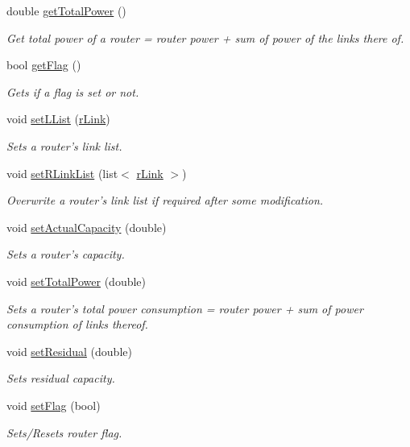 \begin{DoxyCompactItemize}
double \hyperlink{classrouter_a425b6d8372b0951a77097d0e6b49914a}{getTotalPower} ()
\begin{DoxyCompactList}\small\item\em Get total power of a router = router power + sum of power of the links there of. \item\end{DoxyCompactList}\item 
bool \hyperlink{classrouter_aaa3d78b2556a095f725d5a2202265d55}{getFlag} ()
\begin{DoxyCompactList}\small\item\em Gets if a flag is set or not. \item\end{DoxyCompactList}\item 
void \hyperlink{classrouter_a20f58c16edd3ca8d8afb73cf9f27f549}{setLList} (\hyperlink{classrLink}{rLink})
\begin{DoxyCompactList}\small\item\em Sets a router's link list. \item\end{DoxyCompactList}\item 
void \hyperlink{classrouter_a28908a05b7e50a0ab45481c94c8042a8}{setRLinkList} (list$<$ \hyperlink{classrLink}{rLink} $>$)
\begin{DoxyCompactList}\small\item\em Overwrite a router's link list if required after some modification. \item\end{DoxyCompactList}\item 
void \hyperlink{classrouter_a90c5339e7bed5597f06be903305ef588}{setActualCapacity} (double)
\begin{DoxyCompactList}\small\item\em Sets a router's capacity. \item\end{DoxyCompactList}\item 
void \hyperlink{classrouter_a9b06f4e341fea7bf5a853b0a2caf1d2a}{setTotalPower} (double)
\begin{DoxyCompactList}\small\item\em Sets a router's total power consumption = router power + sum of power consumption of links thereof. \item\end{DoxyCompactList}\item 
void \hyperlink{classrouter_ac839466bae2c42cee73a33b4d185f48a}{setResidual} (double)
\begin{DoxyCompactList}\small\item\em Sets residual capacity. \item\end{DoxyCompactList}\item 
void \hyperlink{classrouter_ab4e2af9a6d0412fa8d3e6cea8b411f7c}{setFlag} (bool)
\begin{DoxyCompactList}\small\item\em Sets/Resets router flag. \item\end{DoxyCompactList}\end{DoxyCompactItemize}



